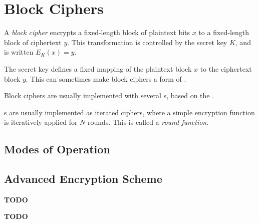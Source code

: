 \section{Block Ciphers}\label{sec:Block_Ciphers}
\begin{definition}\label{def:Block_Cipher}
  A \emph{block cipher} encrypts a fixed-length block of plaintext bits $x$ to a fixed-length block of ciphertext $y$.
  This transformation is controlled by the secret key $K$, and is written $E_{K}(x) = y$.

  The secret key defines a fixed mapping of the plaintext block $x$ to the ciphertext block $y$.
  This can sometimes make block ciphers a form of .

  Block ciphers are usually implemented with several s, based on the .
\end{definition}

\begin{definition}\label{def:Round_Function}
  s are usually implemented as iterated ciphers, where a simple encryption function is iteratively applied for $N$ rounds.
  This is called a \emph{round function}.
\end{definition}

\subsection{Modes of Operation}\label{subsec:Modes_of_Operation}
\begin{definition}\label{def:Mode_of_Operation}
  
\end{definition}

\subsection{Advanced Encryption Scheme}\label{subsec:AES}
\textbf{TODO}
\begin{definition}\label{def:AES}
  \textbf{TODO}
\end{definition}

